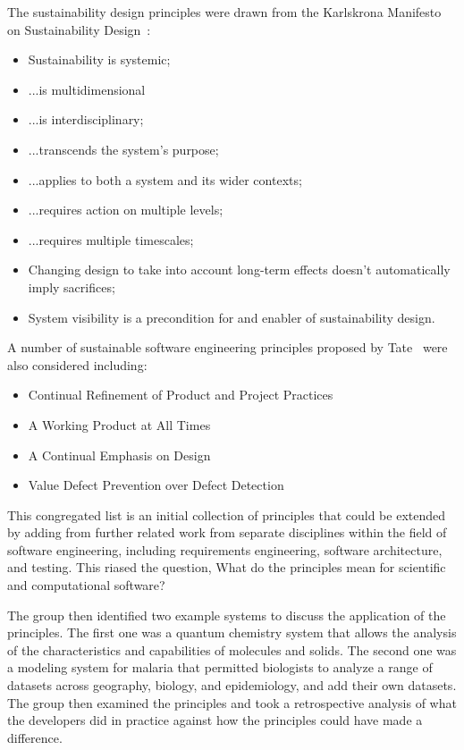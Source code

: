 The sustainability design principles were drawn from the Karlskrona Manifesto on Sustainability Design~\cite{karlskrona,SEIS2015}:
\begin{itemize}
\item Sustainability is systemic;
\item ...is multidimensional
\item ...is interdisciplinary;
\item ...transcends the system's purpose;
\item ...applies to both a system and its wider contexts;
\item ...requires action on multiple levels;
\item ...requires multiple timescales;
\item Changing design to take into account long-term effects doesn't automatically imply sacrifices;
\item System visibility is a precondition for and enabler of sustainability design.
\end{itemize}

A number of sustainable software engineering principles proposed by Tate~\cite{tate2005} were also considered including:

\begin{itemize}
\item Continual Refinement of Product and Project Practices
\item A Working Product at All Times
\item A Continual Emphasis on Design
\item Value Defect Prevention over Defect Detection
\end{itemize}

This congregated list is an initial collection of principles that could be extended by adding from further related work from separate disciplines within the field of software engineering, including requirements engineering, software architecture, and testing. This riased the question, What do the principles mean for scientific and computational software?
 
The group then identified two example systems to discuss the application of the principles. The first one was a quantum chemistry system that allows the analysis of the characteristics and capabilities of molecules and solids. The second one was a modeling system for malaria that permitted biologists to analyze a range of datasets across geography, biology, and epidemiology, and add their own datasets. The group then examined the principles and took a retrospective analysis of what the developers did in practice against how the principles could have made a difference. 

